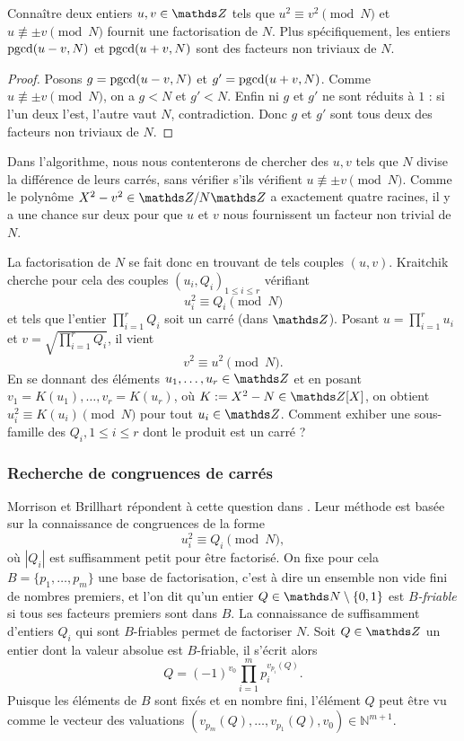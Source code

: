 \begin{lemme}
	Connaître deux entiers $u, v \in \Z$ tels que $u^2 \equiv v^2 
	\pmod{N}$ et $u\not\equiv \pm v\pmod{N}$ fournit une factorisation de $N$.
	Plus spécifiquement, les entiers $\operatorname{pgcd}(u-v, N)$ et $\operatorname{pgcd}(u+v, N)$ sont
	des facteurs non triviaux de $N$.
\end{lemme}

\begin{proof}
	Posons $g =\operatorname{pgcd}(u-v, N)$ et $g' = \operatorname{pgcd}(u+v, N)$. Comme $u\not\equiv \pm
	v\pmod{N}$, on a $g<N$ et $g'<N$. Enfin ni $g$ et $g'$ ne sont réduits à
	$1$ : si l'un deux l'est, l'autre vaut $N$, contradiction. Donc $g$ et $g'$
	sont tous deux des facteurs non triviaux de $N$.
\end{proof}

\begin{remarque}
	Dans l'algorithme, nous nous contenterons de chercher des $u, v$ tels que
	$N$ divise la différence de leurs carrés, sans vérifier s'ils vérifient $u
	\not\equiv \pm v\pmod{N}$. Comme le polynôme $X^2 - v^2 \in \Z/N\Z$ a
    exactement quatre racines, il y a \og{} une chance sur deux \fg{}  pour que
	$u$ et $v$ nous fournissent un facteur non trivial de $N$. \\
\end{remarque}

La factorisation de $N$ se fait donc en trouvant de tels couples $(u, v)$.
Kraitchik cherche pour cela des couples $(u_i, Q_i)_{1\leq i \leq r}$ vérifiant
\[u_i^2 \equiv Q_i \pmod{N}\] et tels que l'entier $\prod_{i=1}^r Q_i$ soit un
carré (dans $\Z$). Posant $u = \prod_{i=1}^r u_i$ et $v = \sqrt{\prod_{i=1}^r
Q_i}$, il vient \[v^2\equiv u^2 \pmod{N}.\] En se donnant des éléments $u_1,
\dots, u_r\in \Z$ et en posant $v_1 = K(u_1), \dots, v_r = K(u_r)$, où $K :=
X^2 - N \in \Z[X]$, on obtient $u_i^2 \equiv K(u_i) \pmod{N}$ pour tout
$u_i \in \Z$. Comment exhiber une sous-famille des $Q_i, 1\leq i\leq r$ dont le
produit est un carré ?

\subsubsection{Recherche de congruences de carrés}

Morrison et Brillhart répondent à cette question dans \cite{MB}. Leur méthode
est basée sur la connaissance de congruences de la forme \[u_i^2 \equiv Q_i
\pmod{N},\] où $| Q_i |$ est suffisamment petit pour être factorisé. On fixe
pour cela $B = \{p_1, \dots, p_m\}$ une base de factorisation, c'est à dire un
ensemble non vide fini de nombres premiers, et l'on dit qu'un entier $Q\in
\N\setminus \{0, 1\}$ est \emph{$B$-friable} si tous ses facteurs premiers sont
dans $B$. La connaissance de suffisamment d'entiers $Q_i$ qui sont $B$-friables
permet de factoriser $N$. Soit $Q\in \Z$ un entier dont la valeur absolue est
$B$-friable, il s'écrit alors \[Q = (-1)^{v_0}\prod_{i=1}^m p_i^{v_{p_i}(Q)}.\]
Puisque les éléments de $B$ sont fixés et en nombre fini, l'élément $Q$ peut
être vu comme le vecteur des valuations $(v_{p_m}(Q), \dots, v_{p_1}(Q), v_0 )
\in \mathbb{N}^{m+1}$.

